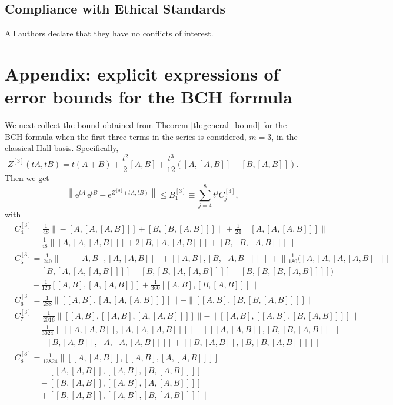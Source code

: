 \documentclass[11pt]{article}
\newcommand{\e}{\ensuremath{\mathrm{e}}}
\begin{document}
\subsection*{Compliance with Ethical Standards}

All authors declare that they have no conflicts of interest.


 \appendix
 
 \section{Appendix: explicit expressions of error bounds for the BCH formula }

We next collect the bound obtained from Theorem  \ref{th:general_bound} for the BCH formula when the first three terms in the series is considered,
$m=3$, in the classical Hall basis. Specifically,
\[
 Z^{[3]}(tA, tB) = t(A+B) + \frac{t^2}{2} [A, B] + \frac{t^3}{12} ([A,[A,B]] - [B,[A,B]]).
\]
Then we get
\begin{equation} \label{B1_3}
    \left\| \e^{t A} \, \e^{t B} - \e^{Z^{[3]}(tA, tB) } \right\|  \le B_1^{[3]} \equiv \sum_{j=4}^8 t^j C_j^{[3]},
\end{equation}
with
\allowdisplaybreaks
\begin{align*}
 & C_4^{[3]} = \frac{1}{48} \big\| -[A,[A,[A,B]]] + [B,[B,[A,B]]] \big\| + \frac{1}{24} \|[A,[A,[A,B]]]\| \\
  & \qquad + \frac{1}{48} \big\| [A,[A,[A,B]]] + 2 [B,[A,[A,B]]] + [B,[B,[A,B]]] \big\| \\
 & C_5^{[3]} =  \frac{1}{240} \big\| -[[A,B],[A,[A,B]]] + [[A,B],[B,[A,B]]] \big\| +  \big\| \frac{1}{180} \Big([A,[A,[A,[A,B]]]] \\
   & \qquad + [B,[A,[A,[A,B]]]] - [B,[B,[A,[A,B]]]] - [B,[B,[B,[A,B]]]] \Big) \\
   & \qquad + \frac{1}{120}  [[A,B],[A,[A,B]]] + \frac{1}{360} [[A,B],[B,[A,B]]] \big\| \\
 & C_6^{[3]} =  \frac{1}{288}  \big\|[[A,B],[A,[A,[A,B]]]]\| - \|[[A,B],[B,[B,[A,B]]]] \big\| \\
 & C_7^{[3]} =  \frac{1}{2016}  \big\|[[A,B],[[A,B],[A,[A,B]]]]\| - \|[[A,B],[[A,B],[B,[A,B]]]] \big\| \\
    & \qquad + \frac{1}{3024} \big\| [[A,[A,B]], [A,[A,[A,B]]]] - \|[[A,[A,B]], [B,[B,[A,B]]]]  \\
    & \qquad  - [[B,[A,B]], [A,[A,[A,B]]]] + [[B,[A,B]], [B,[B,[A,B]]]] \big\|\\
 & C_8^{[3]} = \frac{1}{13824} \big\|[[A,[A,B]], [[A,B],[A,[A,B]]]]  \\
    & \qquad\quad -  [[A,[A,B]], [[A,B],[B,[A,B]]]] \\
    & \qquad\quad - [[B,[A,B]], [[A,B],[A,[A,B]]]] \\
    & \qquad\quad + [[B,[A,B]], [[A,B],[B,[A,B]]]] \big\|
\end{align*}
 
\end{document}
